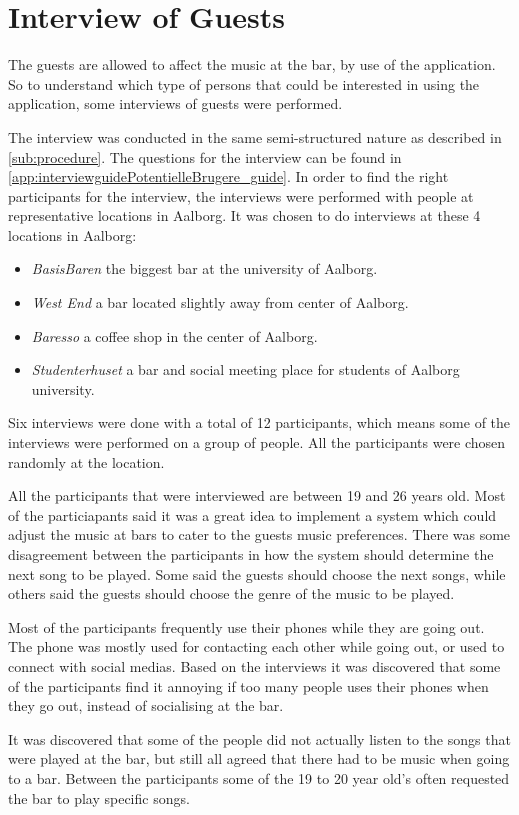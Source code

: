 \section{Interview of Guests}
\label{userInterviews}

The guests are allowed to affect the music at the bar, by use of the application. So to understand which type of persons that could be interested in using the application, some interviews of guests were performed.

The interview was conducted in the same semi-structured nature as described in \cref{sub:procedure}. The questions for the interview can be found in \cref{app:interviewguidePotentielleBrugere_guide}. In order to find the right participants for the interview, the interviews were performed with people at representative locations in Aalborg. It was chosen to do interviews at these 4 locations in Aalborg:

\begin{itemize}
    \item \emph{BasisBaren} the biggest bar at the university of Aalborg.
    \item \emph{West End} a bar located slightly away from center of Aalborg.
    \item \emph{Baresso} a coffee shop in the center of Aalborg.
    \item \emph{Studenterhuset} a bar and social meeting place for students of Aalborg university.
\end{itemize}

Six interviews were done with a total of 12 participants, which means some of the interviews were performed on a group of people. All the participants were chosen randomly at the location.

All the participants that were interviewed are between 19 and 26 years old. Most of the particiapants said it was a great idea to implement a system which could adjust the music at bars to cater to the guests music preferences. There was some disagreement between the participants in how the system should determine the next song to be played. Some said the guests should choose the next songs, while others said the guests should choose the genre of the music to be played.

Most of the participants frequently use their phones while they are going out. The phone was mostly used for contacting each other while going out, or used to connect with social medias.
Based on the interviews it was discovered that some of the participants find it annoying if too many people uses their phones when they go out, instead of socialising at the bar.

It was discovered that some of the people did not actually listen to the songs that were played at the bar, but still all agreed that there had to be music when going to a bar. Between the participants some of the 19 to 20 year old's often requested the bar to play specific songs.
